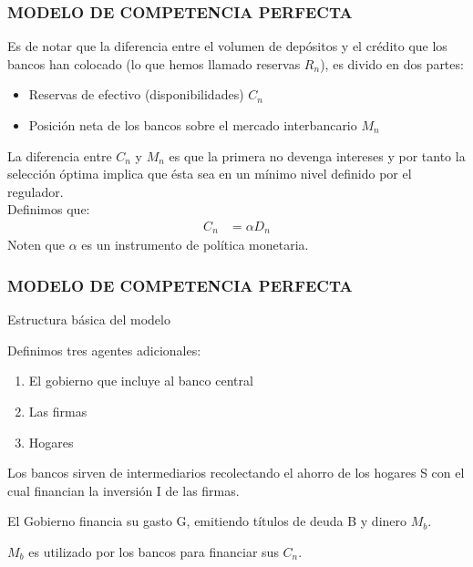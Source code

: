 \documentclass[10pt, xcolor=table, x11names]{beamer}
\begin{document}
\begin{frame}\frametitle{{\normalsize MODELO DE COMPETENCIA PERFECTA} {}}
    
    Es de notar que la diferencia entre el volumen de depósitos y el crédito que los bancos han colocado (lo que hemos llamado reservas $R_{n}$), es divido en dos partes:
    \begin{itemize}
        \item Reservas de efectivo (disponibilidades) $C_{n}$
        \item Posición neta de los bancos sobre el mercado interbancario $M_{n}$
    \end{itemize}
    La diferencia entre $C_{n}$ y $M_{n}$ es que la primera no devenga intereses y por tanto la selección óptima implica que ésta sea en un mínimo nivel definido por el regulador.\\
    Definimos que:
    \begin{align}
    C_{n}&=\alpha D_{n}\nonumber
    \end{align} 
    Noten que $\alpha$ es un instrumento de política monetaria.
    
    


            
\end{frame}


\begin{frame}\frametitle{{\normalsize MODELO DE COMPETENCIA PERFECTA} {}}

\begin{block} {Estructura básica del modelo}
\begin{description}
    \item[Supuesto 5] Definimos tres agentes adicionales:
    \begin{enumerate}
        \item El gobierno que incluye al banco central
        \item Las firmas
        \item Hogares
    \end{enumerate}  
    \item Los bancos sirven de intermediarios recolectando el ahorro de los hogares S con el cual financian la inversión I de las firmas.
    \item El Gobierno financia su gasto G, emitiendo títulos de deuda B y dinero $M_{b}$.
    \item $M_{b}$ es utilizado por los bancos para financiar sus $C_{n}$.
     
        
\end{description}

\end{block}	

\end{frame}
\end{document}
